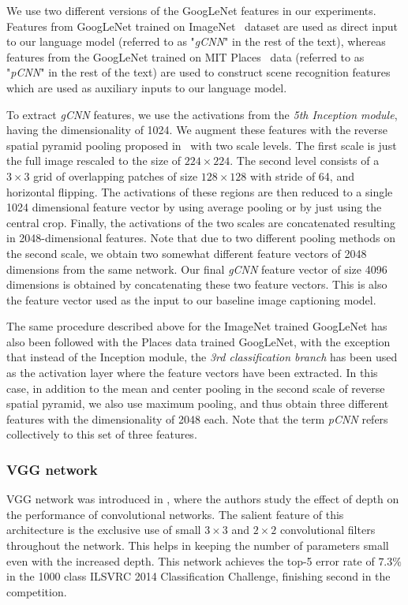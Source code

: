 We use two different versions of the GoogLeNet features in our experiments.
Features from GoogLeNet trained on ImageNet~\cite{ImagenetOrig} dataset are used
as direct input to our language model (referred to as "\emph{gCNN}" in the rest
of the text), whereas features from the GoogLeNet trained on MIT
Places~\cite{Zhou2014NIPS} data (referred to as "\emph{pCNN}" in the rest of the
text) are used to construct scene recognition features which are used as
auxiliary inputs to our language model.

To extract \emph{gCNN} features, we use the activations from the
\emph{5th Inception module}, having the dimensionality of 1024.
We augment these features with the reverse spatial pyramid pooling proposed
in~\cite{Gong2014} with two scale levels.
The first scale is just the full image rescaled to the size of $224\times224$.
The second level consists of a $3\times3$ grid of overlapping patches of size
$128\times128$ with stride of 64, and horizontal flipping.
The activations of these regions are then reduced to a single 1024 dimensional
feature vector by using average pooling or by just using the central crop.
Finally, the activations of the two scales are concatenated resulting in
2048-dimensional features.
Note that due to two different pooling methods on the second scale, we obtain
two somewhat different feature vectors of 2048 dimensions from the same network.
Our final \emph{gCNN} feature vector of size 4096 dimensions is obtained by
concatenating these two feature vectors.
This is also the feature vector used as the input to our baseline image
captioning model. 

The same procedure described above for the ImageNet trained GoogLeNet has
also been followed with the Places data trained GoogLeNet, with the exception
that instead of the Inception module, the \emph{3rd classification branch} has
been used as the activation layer where the feature vectors have been extracted.
In this case, in addition to the mean and center pooling in the second scale of
reverse spatial pyramid, we also use maximum pooling, and thus obtain three
different features with the dimensionality of 2048 each.
Note that the term \emph{pCNN} refers collectively to this set of three features.

\subsubsection{VGG network} 
VGG network was introduced in \cite{Simonyan14c}, where the authors study the
effect of depth on the performance of convolutional networks.
The salient feature of this architecture is the exclusive use of small $3\times3$ and
$2\times2$ convolutional filters throughout the network.
This helps in keeping the number of parameters small even with the increased depth.
This network achieves the top-5 error rate of $7.3\%$ in the 1000 class ILSVRC
2014 Classification Challenge, finishing second in the competition.

